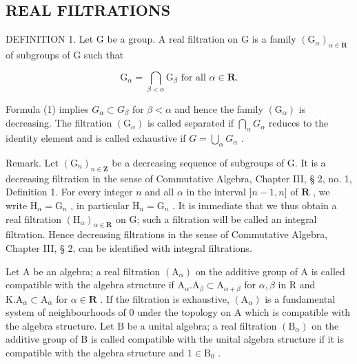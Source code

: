\subsection{REAL FILTRATIONS}

DEFINITION 1. Let G be a group. A real filtration on G is a family \((\mathrm{G}_{\alpha})_{\alpha \in \mathbf{R}}\) of subgroups of G such that

\[
\mathrm{G} _ {\alpha} = \bigcap_ {\beta <   \alpha} \mathrm{G} _ {\beta} \text {   for   all   } \alpha \in \mathbf {R}.\tag{1}
\]

Formula (1) implies \(G_{\alpha} \subset G_{\beta}\) for \(\beta < \alpha\) and hence the family \((\mathrm{G}_{\alpha})\) is decreasing. The filtration \((\mathrm{G}_{\alpha})\) is called separated if \(\bigcap_{\alpha} G_{\alpha}\) reduces to the identity element and is called exhaustive if \(G = \bigcup_{\alpha} G_{\alpha}\) .

Remark. Let \((\mathrm{G}_n)_{n\in \mathbf{Z}}\) be a decreasing sequence of subgroups of G. It is a decreasing filtration in the sense of Commutative Algebra, Chapter III, § 2, no. 1, Definition 1. For every integer \(n\) and all \(\alpha\) in the interval \(]n - 1,n]\) of \(\mathbf{R}\) , we write \(\mathrm{H}_{\alpha} = \mathrm{G}_{n}\) , in particular \(\mathrm{H}_n = \mathrm{G}_n\) . It is immediate that we thus obtain a real filtration \((\mathrm{H}_{\alpha})_{\alpha \in \mathbf{R}}\) on G; such a filtration will be called an integral filtration. Hence decreasing filtrations in the sense of Commutative Algebra, Chapter III, § 2, can be identified with integral filtrations.

Let A be an algebra; a real filtration \((\mathrm{A}_{\alpha})\) on the additive group of A is called compatible with the algebra structure if \(\mathrm{A}_{\alpha}.\mathrm{A}_{\beta}\subset \mathrm{A}_{\alpha +\beta}\) for \(\alpha ,\beta\) in R and \(\mathrm{K.A}_{\alpha}\subset \mathrm{A}_{\alpha}\) for \(\alpha \in \mathbf{R}\) . If the filtration is exhaustive, \((\mathrm{A}_{\alpha})\) is a fundamental system of neighbourhoods of 0 under the topology on A which is compatible with the algebra structure. Let B be a unital algebra; a real filtration \((\mathrm{B}_{\alpha})\) on the additive group of B is called compatible with the unital algebra structure if it is compatible with the algebra structure and \(1\in \mathrm{B}_0\) .

